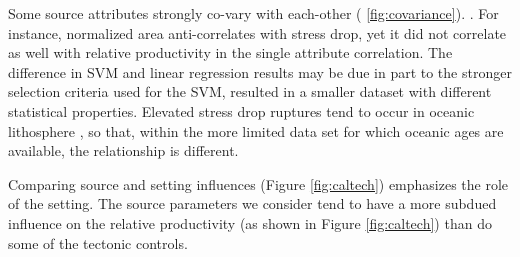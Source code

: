 \documentclass[draft, jgrga]{agujournal2018}
\begin{document}

Some source attributes strongly co-vary with each-other ( \ref{fig:covariance}). . For instance, normalized area anti-correlates with stress drop, yet it did not correlate as well with relative productivity in the single attribute correlation. The difference in SVM and linear regression results may be due in part to the stronger selection criteria used for the SVM, resulted in a smaller dataset with different statistical properties. Elevated stress drop ruptures tend to occur in oceanic lithosphere \citep{choy2004apparent}, so that, within the more limited data set for which oceanic ages are available, the relationship is different. 

Comparing source and setting influences (Figure \ref{fig:caltech}) emphasizes the role of the setting. The source parameters we consider tend to have a more subdued influence on the relative productivity (as shown in Figure \ref{fig:caltech}) than do some of the tectonic controls. 
\end{document}
